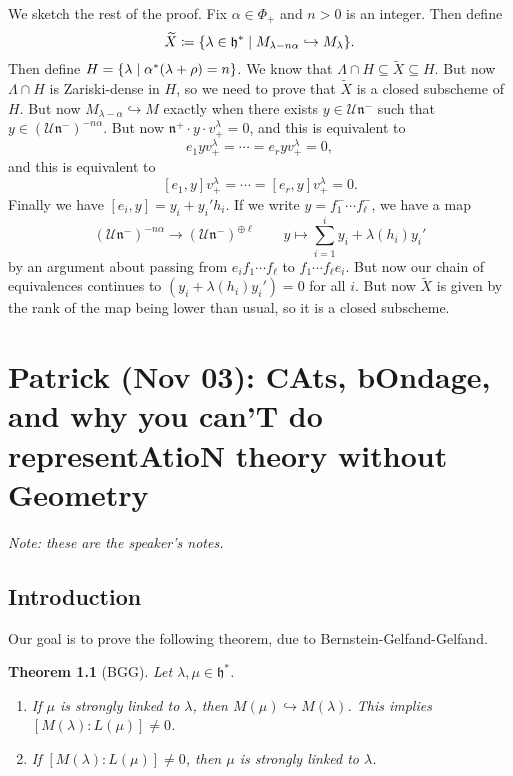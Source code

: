 \documentclass[leqno, openany]{memoir}
\newtheorem{thm}{Theorem}[section]
\theoremstyle{definition}
\theoremstyle{remark}
\theoremstyle{plain}
\theoremstyle{definition}
\theoremstyle{remark}
\newcommand{\U}{\mathcal{U}}
\newcommand{\h}{\mathfrak{h}}
\newcommand{\n}{\mathfrak{n}}
\newcommand{\wt}[1]{\widetilde{#1}}
\begin{document}
We sketch the rest of the proof. Fix $\alpha \in \Phi_+$ and $n > 0$ is an integer. Then define
\[ \wt{X} \coloneqq \qty{\lambda \in \h^* \mid M_{\lambda - n \alpha} \hookrightarrow M_{\lambda}}. \]
Then define $H = \qty{\lambda \mid \alpha^*(\lambda + \rho) = n}$. We know that $\Lambda \cap H \subseteq \wt{X} \subseteq H$. But now $\Lambda \cap H$ is Zariski-dense in $H$, so we need to prove that $\wt{X}$ is a closed subscheme of $H$. But now $M_{\lambda -  \alpha} \hookrightarrow M$ exactly when there exists $y \in \U \n^-$ such that $y \in (\U \n^-)^{-n \alpha}$. But now $\n^+ \cdot y \cdot v_+^{\lambda} = 0$, and this is equivalent to
\[ e_1 y v_+^{\lambda} = \cdots = e_r y v_+^{\lambda} = 0, \]
and this is equivalent to
\[ [e_1, y] v_+^{\lambda} = \cdots = [e_r, y]v_+^{\lambda} = 0. \]
Finally we have $[e_i, y] = y_i + y_i' h_i$. If we write $y = f_1^{-} \cdots f_{\ell}^-$, we have a map
\[ (\U \n^-)^{-n\alpha} \to (\U \n^-)^{\oplus \ell} \qquad y \mapsto \sum_{i=1}^i y_i + \lambda(h_i) y_i' \]
by an argument about passing from $e_i f_1 \cdots f_{\ell}$ to $f_1 \cdots f_{\ell} e_i$. But now our chain of equivalences continues to $(y_i + \lambda(h_i) y_i') = 0$ for all $i$. But now $\wt{X}$ is given by the rank of the map being lower than usual, so it is a closed subscheme.

\chapter{Patrick (Nov 03): CAts, bOndage, and why you can'T do representAtioN theory without Geometry}%
\label{cha:patrick_nov_03_}

\textit{Note: these are the speaker's notes.} 

\section{Introduction}
\label{sec:introduction}

Our goal is to prove the following theorem, due to Bernstein-Gelfand-Gelfand.
\begin{thm}[BGG]
  Let $\lambda, \mu \in \h^{*}$.
  \begin{enumerate}
    \item If $\mu$ is strongly linked to $\lambda$, then $M(\mu) \hookrightarrow M(\lambda)$. This implies $[M(\lambda) : L(\mu) ] \neq 0$.
    \item If $[M(\lambda) : L(\mu)] \neq 0$, then $\mu$ is strongly linked to $\lambda$.
  \end{enumerate}
\end{thm}
\end{document}
